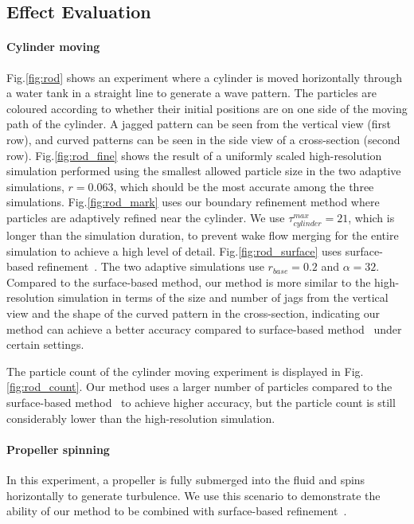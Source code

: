 \documentclass[VANCOUVER,STIX1COL]{WileyNJD-v2}
\begin{document}
\subsection{Effect Evaluation}


\paragraph{Cylinder moving}

Fig.\ref{fig:rod} shows an experiment where a cylinder is moved horizontally through a water tank in a straight line to generate a wave pattern. The particles are coloured according to whether their initial positions are on one side of the moving path of the cylinder. A jagged pattern can be seen from the vertical view (first row), and curved patterns can be seen in the side view of a cross-section (second row). Fig.\ref{fig:rod_fine} shows the result of a uniformly scaled high-resolution simulation performed using the smallest allowed particle size in the two adaptive simulations, $r = 0.063$, which should be the most accurate among the three simulations. Fig.\ref{fig:rod_mark} uses our boundary refinement method where particles are adaptively refined near the cylinder. We use $\tau_{cylinder}^{max} = 21$, which is longer than the simulation duration, to prevent wake flow merging for the entire simulation to achieve a high level of detail. Fig.\ref{fig:rod_surface} uses surface-based refinement~\cite{Winchenbach17}. The two adaptive simulations use $r_{base} = 0.2$ and $\alpha = 32$. Compared to the surface-based method, our method is more similar to the high-resolution simulation in terms of the size and number of jags from the vertical view and the shape of the curved pattern in the cross-section, indicating our method can achieve a better accuracy compared to surface-based method~\cite{Winchenbach17} under certain settings.

The particle count of the cylinder moving experiment is displayed in Fig.\ref{fig:rod_count}. Our method uses a larger number of particles compared to the surface-based method~\cite{Winchenbach17} to achieve higher accuracy, but the particle count is still considerably lower than the high-resolution simulation.

\paragraph{Propeller spinning}

In this experiment, a propeller is fully submerged into the fluid and spins horizontally to generate turbulence. We use this scenario to demonstrate the ability of our method to be combined with surface-based refinement~\cite{Winchenbach17}.
\end{document}

